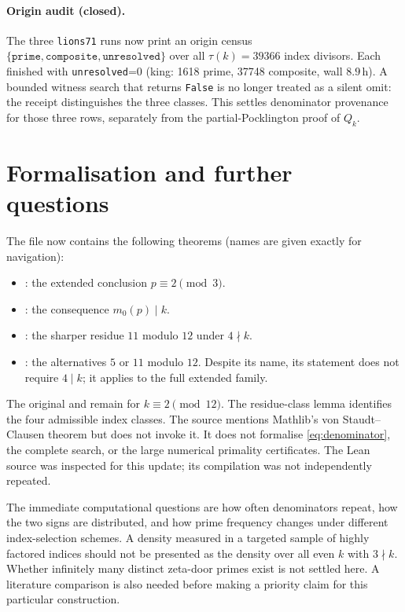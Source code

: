 \documentclass[11pt,a4paper]{article}
\begin{document}
\paragraph{Origin audit (closed).}
The three \texttt{lions71}  runs now print an origin
census \(\{\texttt{prime},\texttt{composite},\texttt{unresolved}\}\) over
all $\tau(k)=39366$ index divisors. Each finished with
\texttt{unresolved}=0 (king: 1618 prime, 37748 composite, wall $8.9$\,h).
A bounded witness search that returns \texttt{False} is no longer treated
as a silent omit: the receipt distinguishes the three classes. This
settles denominator provenance for those three rows, separately from the
partial-Pocklington proof of $Q_k$.

\section{Formalisation and further questions}
The file  now contains the following
theorems (names are given exactly for navigation):
\begin{itemize}
\item {}: the extended conclusion
$p\equiv2\pmod3$.
\item {}: the consequence $m_0(p)\mid k$.
\item {}: the sharper residue
$11$ modulo $12$ under $4\nmid k$.
\item {}: the alternatives $5$ or
$11$ modulo $12$. Despite its name, its statement does not require
$4\mid k$; it applies to the full extended family.
\end{itemize}
The original  and
 remain for $k\equiv2\pmod{12}$.
The residue-class lemma  identifies the
four admissible index classes. The source mentions Mathlib's
von Staudt--Clausen theorem but does not invoke it. It does not formalise
\eqref{eq:denominator}, the complete search, or the large numerical
primality certificates. The Lean source was inspected for this update;
its compilation was not independently repeated.

The immediate computational questions are how often denominators repeat,
how the two signs are distributed, and how prime frequency changes under
different index-selection schemes. A density measured in a targeted
sample of highly factored indices should not be presented as the density
over all even $k$ with $3\nmid k$. Whether infinitely many distinct zeta-door
primes exist is not settled here. A literature comparison is also needed
before making a priority claim for this particular construction.
\end{document}
